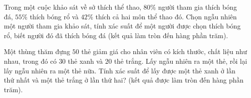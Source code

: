 \begin{bt}%
	Trong một cuộc khảo sát về sở thích thể thao, $80\%$ người tham gia thích bóng đá, $55\%$ thích bóng rổ và $42\%$ thích cả hai môn  thể thao đó. Chọn ngẫu nhiên một người tham gia khảo sát, tính xác suất để một người được chọn thích bóng rổ, biết người đó đã thích bóng đá (kết quả làm tròn đến hàng phần trăm).
\end{bt}

\begin{bt}%
	Một  thùng thăm đựng $50$ thẻ giảm giá cho nhân viên có kích thước, chất liệu như nhau, trong đó có $30$ thẻ xanh và $20$ thẻ trắng. Lấy ngẫu nhiên ra một thẻ, rồi lại lấy ngẫu nhiên ra một thẻ nữa. Tính xác suất để lấy được một thẻ xanh ở lần thứ nhất và một thẻ trắng ở lần thứ hai? (kết quả được làm tròn đến hàng phần trăm). 
\end{bt}

